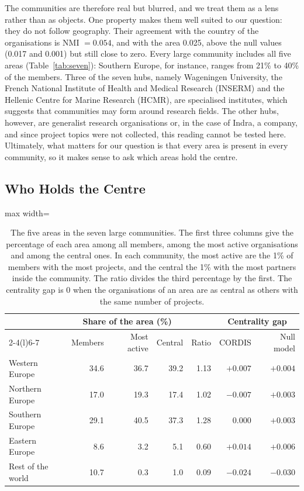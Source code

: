 \documentclass[sigchi]{acmart}
\begin{document}
The communities are therefore real but blurred, and we treat them as a lens rather than as objects. One property makes them well suited to our question: they do not follow geography. Their agreement with the country of the organisations is NMI $= 0.054$, and with the area 0.025, above the null values (0.017 and 0.001) but still close to zero. Every large community includes all five areas (Table~\ref{tab:seven}): Southern Europe, for instance, ranges from 21\% to 40\% of the members. Three of the seven hubs, namely Wageningen University, the French National Institute of Health and Medical Research (INSERM) and the Hellenic Centre for Marine Research (HCMR), are specialised institutes, which suggests that communities may form around research fields. The other hubs, however, are generalist research organisations or, in the case of Indra, a company, and since project topics were not collected, this reading cannot be tested here. Ultimately, what matters for our question is that every area is present in every community, so it makes sense to ask which areas hold the centre.

\subsection{Who Holds the Centre}

\begin{table}[t]
\caption{The five areas in the seven large communities. The first three columns give the percentage of each area among all members, among the most active organisations and among the central ones. In each community, the most active are the 1\% of members with the most projects, and the central the 1\% with the most partners inside the community. The ratio divides the third percentage by the first. The centrality gap is 0 when the organisations of an area are as central as others with the same number of projects.}
\label{tab:regions}
\small
\renewcommand{\arraystretch}{1.15}
\setlength{\tabcolsep}{5pt}
\begin{adjustbox}{max width=\columnwidth}
\begin{tabular}{@{}lrrrrrr@{}}
\toprule
 & \multicolumn{3}{c}{Share of the area (\%)} & & \multicolumn{2}{c}{Centrality gap} \\
\cmidrule(lr){2-4}\cmidrule(l){6-7}
 & Members & Most active & Central & Ratio & CORDIS & Null model \\
\midrule
Western Europe & 34.6 & 36.7 & 39.2 & 1.13 & $+0.007$ & $+0.004$ \\
Northern Europe & 17.0 & 19.3 & 17.4 & 1.02 & $-0.007$ & $+0.003$ \\
Southern Europe & 29.1 & 40.5 & 37.3 & 1.28 & $0.000$ & $+0.003$ \\
Eastern Europe & 8.6 & 3.2 & 5.1 & 0.60 & $+0.014$ & $+0.006$ \\
Rest of the world & 10.7 & 0.3 & 1.0 & 0.09 & $-0.024$ & $-0.030$ \\
\bottomrule
\end{tabular}
\end{adjustbox}
\end{table}
\end{document}
